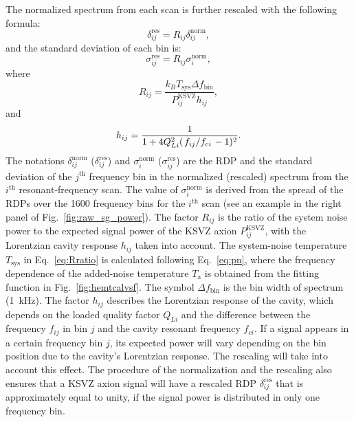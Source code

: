 \documentclass[%
reprint, %
superscriptaddress,
 amsmath,amssymb,
 aps
]{revtex4-2}
\begin{document}
The normalized spectrum from each scan is further rescaled 
 with the following formula:
\begin{equation}
  \label{eq:respower_eqn}
  \delta_{ij}^\text{res} = R_{ij}\delta_{ij}^\text{norm},
\end{equation}
and the standard deviation of each bin is:
\begin{equation}
  \label{eq:ressigma_eqn}
  \sigma_{ij}^\text{res} = R_{ij}\sigma_{i}^\text{norm},
\end{equation}
where 
 \begin{equation}
 R_{ij} = \frac{k_{B}T_\text{sys} \Delta f_\text{bin} }{P_{ij}^\text{KSVZ} h_{ij}}, 
 \label{eq:Rratio}
 \end{equation}
and 
 \begin{equation}
 h_{ij} = \frac{1}{1 + 4Q_{Li}^{2}(\left.f_{ij}\middle/f_{ci}\right.-1)^2}. 
 \label{eq:Lorentz}
 \end{equation}
The notations $\delta_{ij}^\text{norm}$ ($\delta_{ij}^\text{res}$) and 
$\sigma_{i}^\text{norm}$ ($\sigma_{ij}^\text{res}$) are the 
RDP and the standard deviation of the $j^\text{th}$ frequency bin in 
the normalized (rescaled) spectrum from the 
$i^\text{th}$ resonant-frequency scan. 
The value of $\sigma_{i}^\text{norm}$ is derived from the spread of the 
RDPs over the 1600 frequency bins for the $i^\text{th}$ scan 
(see an example in the right panel of Fig.~\ref{fig:raw_sg_power}). 
The factor $R_{ij}$ is the ratio of 
the system noise power to the expected signal power of the KSVZ axion 
$P_{ij}^\text{KSVZ}$, with the Lorentzian cavity response $h_{ij}$ 
taken into account. 
The system-noise temperature $T_\text{sys}$ in Eq.~\eqref{eq:Rratio} is 
calculated following Eq.~\eqref{eq:pn},
 where the frequency dependence of the added-noise temperature $T_\text{a}$ is 
obtained from the fitting function in Fig.~\ref{fig:hemtcalvsf}. 
The symbol $\Delta f_\text{bin}$ is the bin width of spectrum (1~kHz). 
The factor $h_{ij}$ describes the Lorentzian response of the cavity, 
which depends on the loaded quality factor $Q_{Li}$ and the 
difference between the frequency $f_{ij}$ in bin $j$ and the cavity resonant 
frequency $f_{ci}$. 
%
If a signal appears in a certain frequency bin $j$, its expected power 
will vary depending on the bin position due to the cavity's 
Lorentzian response. The rescaling will take into account this effect. 
The procedure of the normalization and the rescaling also ensures that a 
KSVZ axion signal will have a rescaled RDP $\delta_{ij}^\text{res}$ 
that is approximately equal to unity, if the signal power is distributed 
in only one frequency bin. 
\end{document}
